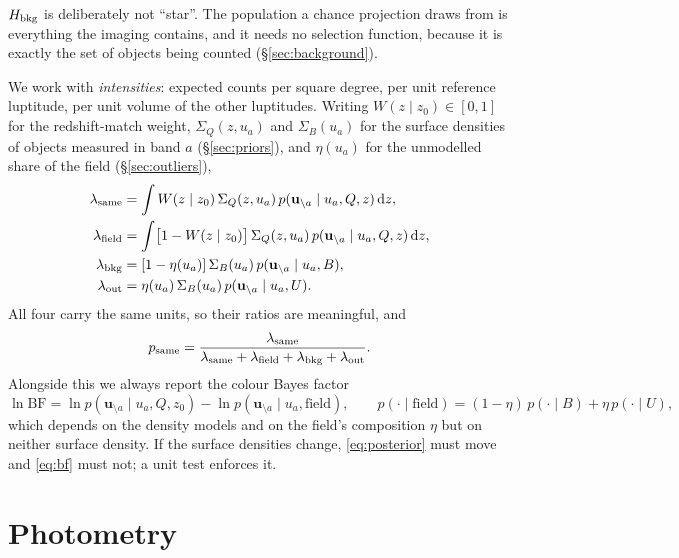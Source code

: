\documentclass[11pt,a4paper]{article}
\newcommand{\uvec}{\mathbf{u}}
\newcommand{\Sq}{\Sigma_{Q}}
\newcommand{\Sb}{\Sigma_{B}}
\newcommand{\dd}{\mathrm{d}}
\newcommand{\Hbkg}{H_{\rm bkg}}
\begin{document}
$\Hbkg$ is deliberately not ``star''. The population a chance projection draws
from is everything the imaging contains, and it needs no selection function,
because it is exactly the set of objects being counted (\S\ref{sec:background}).

We work with \emph{intensities}: expected counts per square degree, per unit
reference luptitude, per unit volume of the other luptitudes. Writing
$W(z\mid z_0)\in[0,1]$ for the redshift-match weight, $\Sq(z,u_a)$ and
$\Sb(u_a)$ for the surface densities of objects measured in band $a$
(\S\ref{sec:priors}), and $\eta(u_a)$ for the unmodelled share of the field
(\S\ref{sec:outliers}),
%
\begin{align}
\lambda_{\rm same} &= \int W(z\mid z_0)\,\Sq(z,u_a)\,
                        p(\uvec_{\setminus a}\mid u_a,Q,z)\,\dd z,
\label{eq:lam_same}\\
\lambda_{\rm field} &= \int \bigl[1-W(z\mid z_0)\bigr]\,\Sq(z,u_a)\,
                        p(\uvec_{\setminus a}\mid u_a,Q,z)\,\dd z,
\label{eq:lam_field}\\
\lambda_{\rm bkg} &= [1-\eta(u_a)]\,\Sb(u_a)\,p(\uvec_{\setminus a}\mid u_a,B),
\label{eq:lam_bkg}\\
\lambda_{\rm out} &= \eta(u_a)\,\Sb(u_a)\,p(\uvec_{\setminus a}\mid u_a,U).
\label{eq:lam_out}
\end{align}
%
All four carry the same units, so their ratios are meaningful, and
%
\begin{equation}
p_{\rm same} =
\frac{\lambda_{\rm same}}
     {\lambda_{\rm same}+\lambda_{\rm field}+\lambda_{\rm bkg}+\lambda_{\rm out}} .
\label{eq:posterior}
\end{equation}
%
Alongside this we always report the colour Bayes factor
%
\begin{equation}
\ln \mathrm{BF} = \ln p(\uvec_{\setminus a}\mid u_a,Q,z_0)
  - \ln p(\uvec_{\setminus a}\mid u_a,\text{field}),
\qquad
p(\cdot\mid\text{field}) = (1-\eta)\,p(\cdot\mid B) + \eta\,p(\cdot\mid U),
\label{eq:bf}
\end{equation}
%
which depends on the density models and on the field's composition $\eta$ but
on neither surface density. If the surface densities change,
\eqref{eq:posterior} must move and \eqref{eq:bf} must not; a unit test enforces
it.

\section{Photometry}
\label{sec:photometry}
\end{document}
